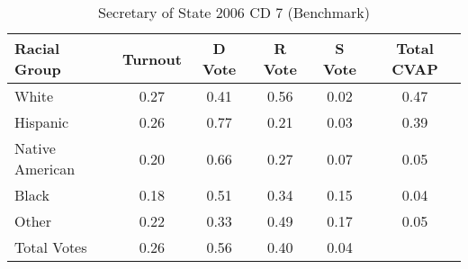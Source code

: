 \begin{table}[htb]
\begin{center}
\caption{Secretary of State 2006 CD 7 (Benchmark)}
\label{sos06_cvap_cd_7_benchmark}
\begin{tabular}{lccccc}
  \hline
Racial Group & Turnout & D Vote & R Vote & S Vote & Total CVAP \\ 
  \hline
White & 0.27 & 0.41 & 0.56 & 0.02 & 0.47 \\ 
  Hispanic & 0.26 & 0.77 & 0.21 & 0.03 & 0.39 \\ 
  Native American & 0.20 & 0.66 & 0.27 & 0.07 & 0.05 \\ 
  Black & 0.18 & 0.51 & 0.34 & 0.15 & 0.04 \\ 
  Other & 0.22 & 0.33 & 0.49 & 0.17 & 0.05 \\ 
  Total Votes & 0.26 & 0.56 & 0.40 & 0.04 &  \\ 
   \hline
\end{tabular}
\end{center}
\end{table}

